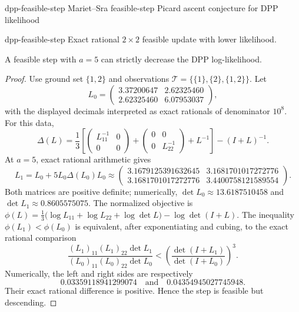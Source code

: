 \begin{cxsummary}{dpp-feasible-step}
Mariet--Sra feasible-step Picard ascent conjecture for DPP likelihood \citeyearpar{MarietSra2015}
\end{cxsummary}

\begin{cxcertificate}{dpp-feasible-step}
Exact rational $2\times2$ feasible update with lower likelihood.
\end{cxcertificate}

\begin{cxrefutation}
\begin{theorem}\label{thm:dpp}
A feasible step with $a=5$ can strictly decrease the DPP log-likelihood.
\end{theorem}
\begin{proof}
Use ground set $\{1,2\}$ and observations $\mathcal T=\bigl\{\{1\},\{2\},\{1,2\}\bigr\}$.
Let
\[
L_0=\begin{pmatrix}3.37200647&2.62325460\\2.62325460&6.07953037\end{pmatrix},
\]
with the displayed decimals interpreted as exact rationals of denominator $10^8$.  For this data,
\[
\Delta(L)=\frac13\left[
\begin{pmatrix}L_{11}^{-1}&0\\0&0\end{pmatrix}
+\begin{pmatrix}0&0\\0&L_{22}^{-1}\end{pmatrix}+L^{-1}\right]-(I+L)^{-1}.
\]
At $a=5$, exact rational arithmetic gives
\[
L_1=L_0+5L_0\Delta(L_0)L_0
\approx\begin{pmatrix}
3.1679125391632645&3.1681701017272776\\
3.1681701017272776&3.4400758121589554
\end{pmatrix}.
\]
Both matrices are positive definite; numerically, $\det L_0\approx13.6187510458$ and $\det L_1\approx0.8605575075$.
The normalized objective is $\phi(L)=\frac13\bigl(\log L_{11}+\log L_{22}+\log\det L\bigr)-\log\det(I+L).$
The inequality $\phi(L_1)<\phi(L_0)$ is equivalent, after exponentiating and cubing, to the exact rational comparison
\[
\frac{(L_1)_{11}(L_1)_{22}\det L_1}{(L_0)_{11}(L_0)_{22}\det L_0}
<\left(\frac{\det(I+L_1)}{\det(I+L_0)}\right)^3.
\]
Numerically, the left and right sides are respectively
\[
0.03359118941299074
\quad\text{and}\quad
0.04354945027745948.
\]
Their exact rational difference is positive.  Hence the step is feasible but descending.
\end{proof}
\end{cxrefutation}


